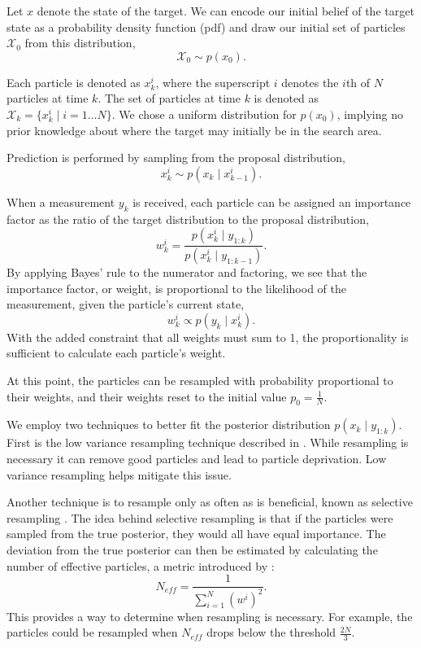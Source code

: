 \documentclass[letterpaper, 10 pt, conference]{ieeeconf}  %
\begin{document}
Let $x$ denote the state of the target. We can encode our initial belief of the target state as a probability density function (pdf) and draw our initial set of particles $\mathcal{X}_0$ from this distribution,
\begin{equation}%
    \mathcal{X}_0 \sim p(x_0).
\end{equation}

Each particle is denoted as $x^i_k$, where the superscript $i$ denotes the $i$th of $N$ particles at time $k$. The set of particles at time $k$ is denoted as $\mathcal{X}_k = \{x^i_k \mid i = 1 \ldots N\}$. We chose a uniform distribution for $p(x_0)$, implying no prior knowledge about where the target may initially be in the search area.

Prediction is performed by sampling from the proposal distribution,
\begin{equation}\label{eq:proposal_dist}
    x^i_k \sim p(x_k \mid x^i_{k-1}).
\end{equation}

When a measurement $y_k$ is received, each particle can be assigned an importance factor as the ratio of the target distribution to the proposal distribution,
\begin{equation}%
    w^i_k = \frac{p(x^i_k \mid y_{1:k})}{p(x^i_k \mid y_{1:k-1})}.
\end{equation}
By applying Bayes' rule to the numerator and factoring, we see that the importance factor, or weight, is proportional to the likelihood of the measurement, given the particle's current state,
\begin{equation}%
    w^i_k \propto p(y_k \mid x^i_k).
\end{equation}
With the added constraint that all weights must sum to 1, the proportionality is sufficient to calculate each particle's weight.

At this point, the particles can be resampled with probability proportional to their weights, and their weights reset to the initial value $p_0 = \frac{1}{N}$.

We employ two techniques to better fit the posterior distribution $p(x_k \mid y_{1:k})$. First is the low variance resampling technique described in \cite{Thrun2006}. While resampling is necessary it can remove good particles and lead to particle deprivation. Low variance resampling helps mitigate this issue.

Another technique is to resample only as often as is beneficial, known as selective resampling \cite{Grisetti2005}. The idea behind selective resampling is that if the particles were sampled from the true posterior, they would all have equal importance. The deviation from the true posterior can then be estimated by calculating the number of effective particles, a metric introduced by \cite{Liu1996}:
\begin{equation}%
N_{eff} = \frac{1}{\sum_{i=1}^N (w^i)^2}.
\end{equation}
This provides a way to determine when resampling is necessary. For example, the particles could be resampled when $N_{eff}$ drops below the threshold $\frac{2N}{3}$.
\end{document}

